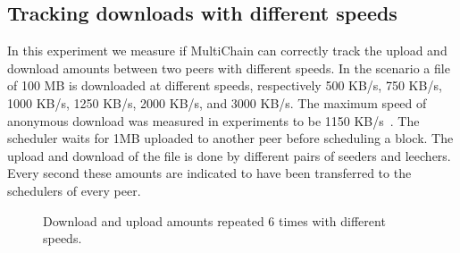\subsection{Tracking downloads with different speeds}
In this experiment we measure if MultiChain can correctly track the upload and download amounts
between two peers with different speeds.
In the scenario a file of 100 MB is downloaded at different speeds,
respectively 500 KB/s, 750 KB/s, 1000 KB/s, 1250 KB/s, 2000 KB/s, and 3000 KB/s.
The maximum speed of anonymous download was measured in experiments to be 1150 KB/s~\cite{ruigrok-anonymous}.
The scheduler waits for 1MB uploaded to another peer before scheduling a block.
The upload and download of the file is done by different pairs of seeders and leechers.
Every second these amounts are indicated to have been transferred to the schedulers of every peer.

\begin{figure}
\centering
{}
\caption{Download and upload amounts repeated 6 times with different speeds.}
\label{fig:synthetic-simple-amounts}
\end{figure}

